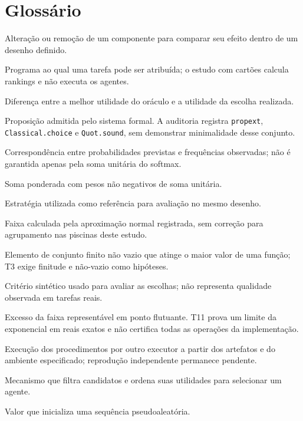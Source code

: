 \chapter*{Glossário}\label{ap:glossario}
\begin{description}[style=nextline,leftmargin=0pt,labelindent=0pt]
\item[Ablação.] Alteração ou remoção de um componente para comparar seu efeito dentro de um desenho definido.
\item[Agente.] Programa ao qual uma tarefa pode ser atribuída; o estudo com cartões calcula rankings e não executa os agentes.
\item[Arrependimento.] Diferença entre a melhor utilidade do oráculo e a utilidade da escolha realizada.
\item[Axioma.] Proposição admitida pelo sistema formal. A auditoria registra \texttt{propext}, \texttt{Classical.choice} e \texttt{Quot.sound}, sem demonstrar minimalidade desse conjunto.
\item[Calibração probabilística.] Correspondência entre probabilidades previstas e frequências observadas; não é garantida apenas pela soma unitária do softmax.
\item[Combinação convexa.] Soma ponderada com pesos não negativos de soma unitária.
\item[Comparador.] Estratégia utilizada como referência para avaliação no mesmo desenho.
\item[Intervalo exploratório.] Faixa calculada pela aproximação normal registrada, sem correção para agrupamento nas piscinas deste estudo.
\item[Maximizador.] Elemento de conjunto finito não vazio que atinge o maior valor de uma função; T3 exige finitude e não-vazio como hipóteses.
\item[Oráculo.] Critério sintético usado para avaliar as escolhas; não representa qualidade observada em tarefas reais.
\item[Overflow.] Excesso da faixa representável em ponto flutuante. T11 prova um limite da exponencial em reais exatos e não certifica todas as operações da implementação.
\item[Reprodução.] Execução dos procedimentos por outro executor a partir dos artefatos e do ambiente especificado; reprodução independente permanece pendente.
\item[Roteador.] Mecanismo que filtra candidatos e ordena suas utilidades para selecionar um agente.
\item[Semente.] Valor que inicializa uma sequência pseudoaleatória.

\end{description}
